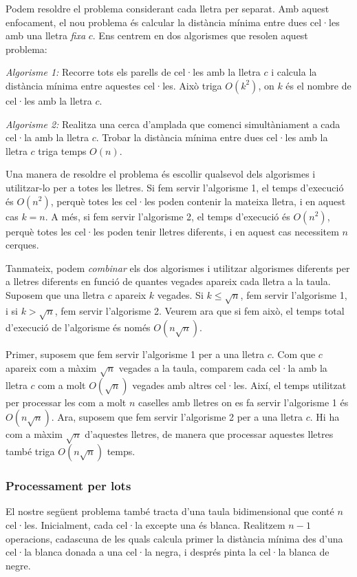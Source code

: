 Podem resoldre el problema considerant cada lletra per separat. Amb
aquest enfocament, el nou problema és calcular la distància mínima
entre dues cel·les amb una lletra \emph{fixa} $c$. Ens centrem en dos
algorismes que resolen aquest problema:

\emph{Algorisme 1:} Recorre tots els parells de cel·les amb la lletra
$c$ i calcula la distància mínima entre aquestes cel·les. Això triga
$O(k^2)$, on $k$ és el nombre de cel·les amb la lletra $c$.

\emph{Algorisme 2:} Realitza una cerca d'amplada que comenci
simultàniament a cada cel·la amb la lletra $c$. Trobar la distància
mínima entre dues cel·les amb la lletra $c$ triga temps $O(n)$.

Una manera de resoldre el problema és escollir qualsevol dels
algorismes i utilitzar-lo per a totes les lletres. Si fem servir
l'algorisme 1, el temps d'execució és $O(n^2)$, perquè totes les
cel·les poden contenir la mateixa lletra, i en aquest cas $k=n$. A
més, si fem servir l'algorisme 2, el temps d'execució és $O(n^2)$,
perquè totes les cel·les poden tenir lletres diferents, i en aquest
cas necessitem $n$ cerques.

Tanmateix, podem \emph{combinar} els dos algorismes i utilitzar
algorismes diferents per a lletres diferents en funció de quantes
vegades apareix cada lletra a la taula. Suposem que una lletra $c$
apareix $k$ vegades. Si $k \le \sqrt n$, fem servir l'algorisme 1, i
si $k > \sqrt n$, fem servir l'algorisme 2. Veurem ara que si fem
això, el temps total d'execució de l'algorisme és només $O(n \sqrt
n)$.

Primer, suposem que fem servir l'algorisme 1 per a una lletra $c$. Com
que $c$ apareix com a màxim $\sqrt n$ vegades a la taula, comparem
cada cel·la amb la lletra $c$ com a molt $O(\sqrt n)$ vegades amb
altres cel·les. Així, el temps utilitzat per processar les com a molt
$n$ caselles amb lletres on es fa servir l'algorisme 1 és $O(n \sqrt
n)$. Ara, suposem que fem servir l'algorisme 2 per a una lletra
$c$. Hi ha com a màxim $\sqrt n$ d'aquestes lletres, de manera que
processar aquestes lletres també triga $O(n \sqrt n)$ temps.

\subsubsection{Processament per lots}

El nostre següent problema també tracta d'una taula bidimensional que
conté $n$ cel·les. Inicialment, cada cel·la excepte una és
blanca. Realitzem $n-1$ operacions, cadascuna de les quals calcula
primer la distància mínima des d'una cel·la blanca donada a una cel·la
negra, i després pinta la cel·la blanca de negre.

